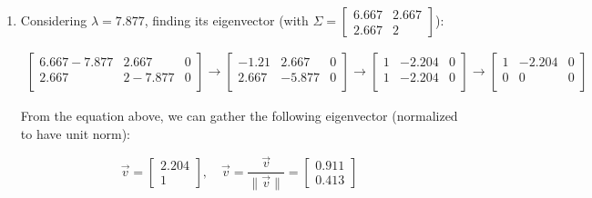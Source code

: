 \documentclass[12pt]{article}
\begin{document}
\begin{enumerate}
  \item {
        Considering $\lambda = 7.877$, finding its eigenvector (with $\Sigma = \begin{bmatrix}
            6.667 & 2.667 \\
            2.667 & 2
          \end{bmatrix}$):

        \begin{align*}
          \left[\begin{array}{cc|c}
                    6.667 - 7.877 & 2.667     & 0 \\
                    2.667         & 2 - 7.877 & 0 \\
                  \end{array}\right] \rightarrow
          \left[\begin{array}{cc|c}
                    -1.21 & 2.667  & 0 \\
                    2.667 & -5.877 & 0 \\
                  \end{array}\right] \rightarrow
          \left[\begin{array}{cc|c}
                    1 & -2.204 & 0 \\
                    1 & -2.204 & 0 \\
                  \end{array}\right] \rightarrow
          \left[\begin{array}{cc|c}
                    1 & -2.204 & 0 \\
                    0 & 0      & 0 \\
                  \end{array}\right]
        \end{align*}

        From the equation above, we can gather the following eigenvector (normalized
        to have unit norm):

        \begin{equation*}
          \vec{v} = \begin{bmatrix}
            2.204 \\
            1
          \end{bmatrix}, \quad
          \vec{v} = \frac{\vec{v}}{\|\vec{v}\|} = \begin{bmatrix}
            0.911 \\
            0.413
          \end{bmatrix}
        \end{equation*}
        }
\end{enumerate}
\end{document}
